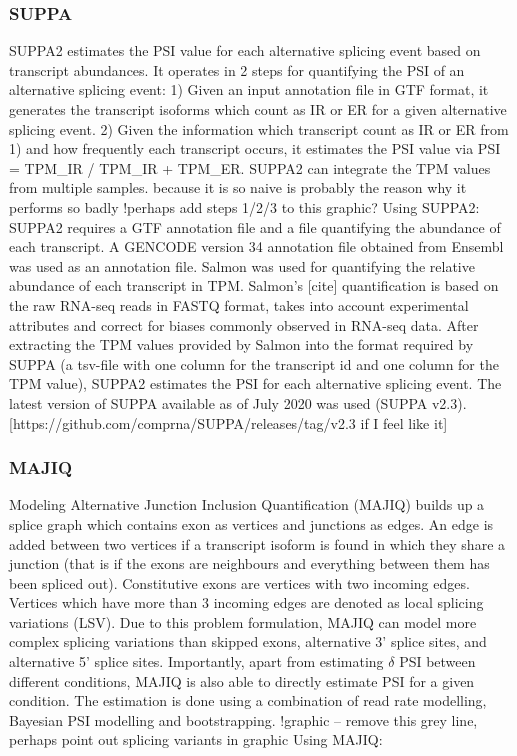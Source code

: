 \subsubsection{SUPPA}\label{subsubsec:suppa}
SUPPA2 \cite{suppa2} estimates the PSI value for each alternative splicing event based on transcript abundances. It operates in 2 steps for quantifying the PSI of an alternative splicing event:
1) Given an input annotation file in GTF format, it generates the transcript isoforms which count as IR or ER for a given alternative splicing event.
2) Given the information which transcript count as IR or ER from 1) and how frequently each transcript occurs, it estimates the PSI value via PSI = TPM_IR / TPM_IR + TPM_ER. SUPPA2 can integrate the TPM values from multiple samples.
because it is so naive is probably the reason why it performs so badly
!perhaps add steps 1/2/3 to this graphic?
Using SUPPA2:
SUPPA2 requires a GTF annotation file and a file quantifying the abundance of each transcript. A GENCODE version 34 annotation file obtained from Ensembl was used as an annotation file. Salmon was used for quantifying the relative abundance of each transcript in TPM. Salmon's [cite] quantification is based on the raw RNA-seq reads in FASTQ format, takes into account experimental attributes and correct for biases commonly observed in RNA-seq data. After extracting the TPM values provided by Salmon into the format required by SUPPA (a tsv-file with one column for the transcript id and one column for the TPM value), SUPPA2 estimates the PSI for each alternative splicing event.
The latest version of SUPPA available as of July 2020 was used (SUPPA v2.3). [https://github.com/comprna/SUPPA/releases/tag/v2.3 if I feel like it]
\subsubsection{MAJIQ}\label{subsubsec:majiq}
Modeling Alternative Junction Inclusion Quantification (MAJIQ) builds up a splice graph \cite{majiq2} which contains exon as vertices and junctions as edges. An edge is added between two vertices if a transcript isoform is found in which they share a junction (that is if the exons are neighbours and everything between them has been spliced out).
Constitutive exons are vertices with two incoming edges.
Vertices which have more than 3 incoming edges are denoted as local splicing variations (LSV). Due to this problem formulation, MAJIQ can model more complex splicing variations than skipped exons, alternative 3' splice sites, and alternative 5' splice sites. Importantly, apart from estimating $\delta$ PSI between different conditions, MAJIQ is also able to directly estimate PSI for a given condition. The estimation is done using a combination of read rate modelling, Bayesian PSI modelling and bootstrapping.
!graphic -- remove this grey line, perhaps point out splicing variants in graphic
Using MAJIQ:

